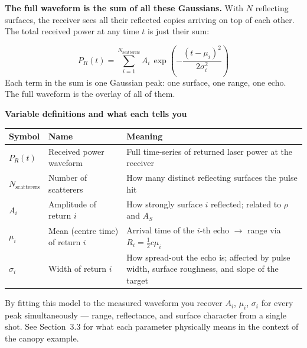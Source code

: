 \documentclass[12pt, a4paper]{article}
\begin{document}
\textbf{The full waveform is the sum of all these Gaussians.}
With $N$ reflecting surfaces, the receiver sees all their reflected copies
arriving on top of each other.
The total received power at any time $t$ is just their sum:

\[
  P_R(t)
  = \sum_{i=1}^{N_\text{scatterers}}
    A_i \, \exp\!\left(-\frac{(t - \mu_i)^2}{2\sigma_i^2}\right)
\]
Each term in the sum is one Gaussian peak: one surface, one range, one
echo.  The full waveform is the overlay of all of them.

\begin{notebox}
  \textbf{Variable definitions and what each tells you}

  \vspace{4pt}
  \begin{tabular}{@{}l p{3.5cm} p{7.5cm}@{}}
    \toprule
    \textbf{Symbol} & \textbf{Name} & \textbf{Meaning} \\
    \midrule
    $P_R(t)$   & Received power waveform
      & Full time-series of returned laser power at the receiver \\[2pt]
    $N_\text{scatterers}$ & Number of scatterers
      & How many distinct reflecting surfaces the pulse hit \\[2pt]
    $A_i$      & Amplitude of return $i$
      & How strongly surface $i$ reflected; related to $\rho$ and $A_S$ \\[2pt]
    $\mu_i$    & Mean (centre time) of return $i$
      & Arrival time of the $i$-th echo $\to$ range via $R_i = \tfrac{1}{2}c\mu_i$ \\[2pt]
    $\sigma_i$ & Width of return $i$
      & How spread-out the echo is; affected by pulse width, surface
        roughness, and slope of the target \\
    \bottomrule
  \end{tabular}

  \vspace{6pt}
  By fitting this model to the measured waveform you recover $A_i$,
  $\mu_i$, $\sigma_i$ for every peak simultaneously --- range,
  reflectance, and surface character from a single shot.
  See Section~3.3 for what each parameter physically means in the
  context of the canopy example.
\end{notebox}
\end{document}
